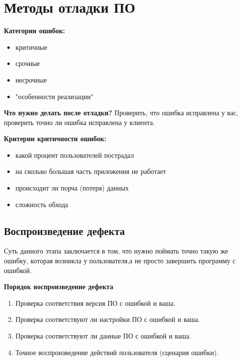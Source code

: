 \documentclass[bachelor, och, pract]{SCWorks}
\theoremstyle{remark}
\newtheorem{comment}{Замечание}
\begin{document}
    
    

    
    \section{Методы отладки ПО}
    \textbf{Категории ошибок:}
    \begin{itemize}[label=$\bullet$]
        \item критичные
        \item срочные
        \item несрочные
        \item "особенности реализации"
    \end{itemize}

    \textbf{Что нужно делать после отладки?} Проверить, что ошибка исправлена у вас, проверить точно ли ошибка исправлена у клиента.
  

    \textbf{Критерии критичности ошибок:}
    \begin{itemize}[label=$\bullet$]
        \item какой процент пользователей пострадал
        \item на сколько большая часть приложения не работает
        \item происходит ли порча (потеря) данных
        \item сложность обхода
    \end{itemize}


    \subsection{Воспроизведение дефекта}
    Суть данного этапа заключается в том, что нужно поймать точно такую же ошибку, которая возникла у пользователя,а не просто завершить программу с ошибкой. 

    \textbf{Порядок воспроизведение дефекта}
    \begin{enumerate}
        \item Проверка соответствия версия ПО с ошибкой и ваша.
        \item Проверка соответствуют ли настройки ПО с ошибкой и ваша.
        \item Проверка соответствуют ли данные ПО с ошибкой и ваша.
        \item Точное воспроизведение действий пользователя (сценария ошибки).
    \end{enumerate}
    
\end{document}
